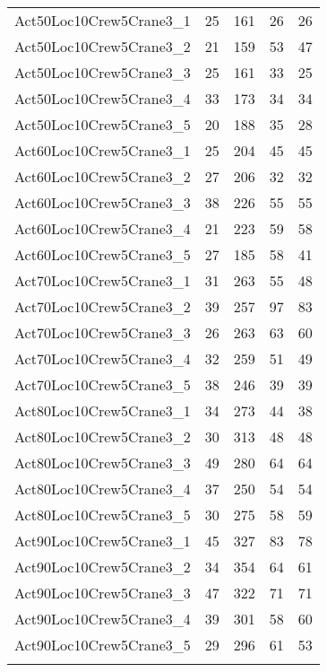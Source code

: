 \begin{center}
\begin{longtable}{ | l | c | c | c | c | }
Act50Loc10Crew5Crane3\_1	&	25	&	161	&	26	&	26	\\
Act50Loc10Crew5Crane3\_2	&	21	&	159	&	53	&	47	\\
Act50Loc10Crew5Crane3\_3	&	25	&	161	&	33	&	25	\\
Act50Loc10Crew5Crane3\_4	&	33	&	173	&	34	&	34	\\
Act50Loc10Crew5Crane3\_5	&	20	&	188	&	35	&	28	\\
Act60Loc10Crew5Crane3\_1	&	25	&	204	&	45	&	45	\\
Act60Loc10Crew5Crane3\_2	&	27	&	206	&	32	&	32	\\
Act60Loc10Crew5Crane3\_3	&	38	&	226	&	55	&	55	\\
Act60Loc10Crew5Crane3\_4	&	21	&	223	&	59	&	58	\\
Act60Loc10Crew5Crane3\_5	&	27	&	185	&	58	&	41	\\
Act70Loc10Crew5Crane3\_1	&	31	&	263	&	55	&	48	\\
Act70Loc10Crew5Crane3\_2	&	39	&	257	&	97	&	83	\\
Act70Loc10Crew5Crane3\_3	&	26	&	263	&	63	&	60	\\
Act70Loc10Crew5Crane3\_4	&	32	&	259	&	51	&	49	\\
Act70Loc10Crew5Crane3\_5	&	38	&	246	&	39	&	39	\\
Act80Loc10Crew5Crane3\_1	&	34	&	273	&	44	&	38	\\
Act80Loc10Crew5Crane3\_2	&	30	&	313	&	48	&	48	\\
Act80Loc10Crew5Crane3\_3	&	49	&	280	&	64	&	64	\\
Act80Loc10Crew5Crane3\_4	&	37	&	250	&	54	&	54	\\
Act80Loc10Crew5Crane3\_5	&	30	&	275	&	58	&	59	\\
Act90Loc10Crew5Crane3\_1	&	45	&	327	&	83	&	78	\\
Act90Loc10Crew5Crane3\_2	&	34	&	354	&	64	&	61	\\
Act90Loc10Crew5Crane3\_3	&	47	&	322	&	71	&	71	\\
Act90Loc10Crew5Crane3\_4	&	39	&	301	&	58	&	60	\\
Act90Loc10Crew5Crane3\_5	&	29	&	296	&	61	&	53	\\
\hline																			
\label{tab:solutionAssignAltRFSTF100s}					
\end{longtable}									
\end{center}	

